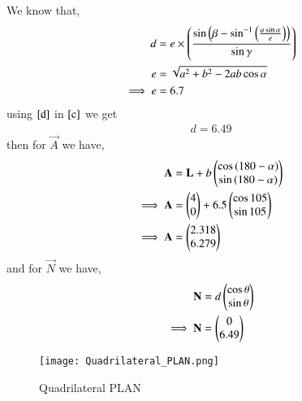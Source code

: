 \documentclass[journal,12pt,twocolumn]{IEEEtran}
\begin{document}
We know that,
\begin{align}
        d &= e\times\left(\frac{\sin{\ensuremath{\left(\beta-\sin^{-1}\left({\frac{a\sin\alpha}{e}}\right)\right)}}}{\sin\gamma}\right)\label{c}\\
        e &= \sqrt{a^2+b^2-2ab\cos{\alpha}}\\
        \implies e &= 6.7\label{d}
\end{align}
using $\eqref{d}$ in $\eqref{c}$ we get
\begin{align}
    d=6.49
\end{align}
then for $\vec{A}$ we have,
\begin{align}
    \mathbf{A} &= \mathbf{L}+b\begin{pmatrix}\cos{(180-\alpha)}\\
                              \sin{(180-\alpha)}\end{pmatrix}\\
    \implies \mathbf{A} &= \begin{pmatrix}4\\
                              0\end{pmatrix}+6.5\begin{pmatrix}\cos{105}\\
                                            \sin{105}\end{pmatrix}\\
    \implies \mathbf{A} &= \begin{pmatrix}2.318\\
                              6.279\end{pmatrix}
\end{align}
and for $\vec{N}$ we have,
\begin{align}
    \mathbf{N} &= d\begin{pmatrix}\cos{\theta}\\
                       \sin{\theta}\end{pmatrix}\\
    \implies \mathbf{N} &= \begin{pmatrix}0\\
                               6.49\end{pmatrix}
\end{align}
\begin{figure}[!ht]
    \texttt{[image: Quadrilateral\_PLAN.png]}
    \caption{Quadrilateral PLAN}
    \label{fig:Quadrilateral PLAN}	
\end{figure}
\end{document}
